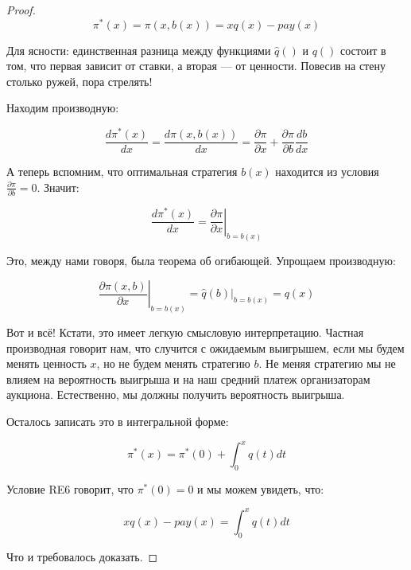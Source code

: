 \begin{proof}
\[ \pi^{*}(x)=\pi(x,b(x))=xq(x)-pay(x) \]

Для ясности: единственная разница между функциями $ \widehat{q}() $ и $ q() $ состоит в том, что первая зависит от ставки, а вторая — от ценности. Повесив на стену столько ружей, пора стрелять!

Находим производную:

\begin{equation}
\frac{d \pi^{*}(x)}{dx}=\frac{d \pi(x,b(x))}{dx}=\frac{\partial \pi}{\partial x}+\frac{\partial \pi}{\partial b}\frac{d b }{d x}
\end{equation}

А теперь вспомним, что оптимальная стратегия $ b(x) $ находится из условия $ \frac{\partial \pi}{\partial b}=0 $. Значит:

\begin{equation}
\frac{d \pi^{*}(x)}{dx}=\left.\frac{\partial \pi}{\partial x}\right|_{b=b(x)}
\end{equation}

Это, между нами говоря, была теорема об огибающей. Упрощаем производную:

\begin{equation}
\left.\frac{\partial \pi(x,b)}{\partial x}\right|_{b=b(x)}=\widehat{q}(b)|_{b=b(x)}=q(x)
\end{equation}

Вот и всё! Кстати, это имеет легкую смысловую интерпретацию. Частная производная говорит нам, что случится с ожидаемым выигрышем, если мы будем менять ценность $x$, но не будем менять стратегию $ b $. Не меняя стратегию мы не влияем на вероятность выигрыша и на наш средний платеж организаторам аукциона. Естественно, мы должны получить вероятность выигрыша.

Осталось записать это в интегральной форме:

\begin{equation}
\pi^{*}(x)=\pi^{*}(0)+\int_{0}^{x}q(t)dt
\end{equation}

Условие RE6 говорит, что $ \pi^{*}(0)=0 $ и мы можем увидеть, что:

\begin{equation}
xq(x)-pay(x)=\int_{0}^{x}q(t)dt
\end{equation}

Что и требовалось доказать.
\end{proof}

